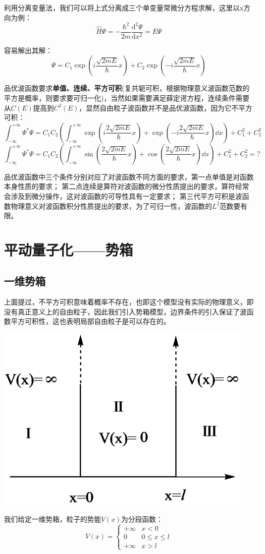 利用分离变量法，我们可以将上式分离成三个单变量常微分方程求解，这里以x方向为例：
\[\hat{H}\varPsi=-\frac{\hbar^2}{2m}\frac{\mathrm{d}^2\varPsi}{\mathrm{d}x^2}=E\varPsi\]

容易解出其解：
\[\varPsi=C_1\exp\left (i \frac{\sqrt{2mE}}{\hbar}x \right )+C_2\exp\left ( -i\frac{\sqrt{2mE}}{\hbar}x \right )\]

品优波函数要求\textbf{单值、连续、平方可积}(复共轭可积，根据物理意义波函数范数的平方是概率，则要求要可归一化)，当然如果需要满足薛定谔方程，连续条件需要从$C(E)$提高到$C^2(E)$，显然自由粒子波函数并不是品优波函数，因为它不平方可积：
\[\int_{-\infty}^{+\infty}\varPsi^*\varPsi=C_1C_2 \left ( \int_{-\infty}^{+\infty}\exp\left (i \frac{2\sqrt{2mE}}{\hbar}x \right )+\exp\left (-i \frac{2\sqrt{2mE}}{\hbar}x \right )\dd x \right )+C_1^2+C_2^2\]
\[\int_{-\infty}^{+\infty}\varPsi^*\varPsi=C_1C_2 \left ( \int_{-\infty}^{+\infty}\sin\left ( \frac{2\sqrt{2mE}}{\hbar}x \right )+\cos\left ( \frac{2\sqrt{2mE}}{\hbar}x \right )\dd x \right )+C_1^2+C_2^2=?\]

品优波函数中三个条件分别对应了对波函数不同方面的要求，第一点单值是对函数本身性质的要求；
第二点连续是算符对波函数的微分性质提出的要求，算符经常会涉及到微分操作，这对波函数的可导性具有一定要求；
第三代平方可积是波函数物理意义对波函数积分性质提出的要求，为了可归一性，波函数的$L^2$范数要有限。

\section{平动量子化——势箱}
\subsection{一维势箱}
上面提过，不平方可积意味着概率不存在，也即这个模型没有实际的物理意义，即没有真正意义上的自由粒子，因此我们引入势箱模型，边界条件的引入保证了波函数平方可积性，这也表明局部自由粒子是可以存在的。
\begin{center}
    \includegraphics[scale=0.5]{fig/lzhx/微信图片_20211025092646.png}
\end{center}
我们给定一维势箱，粒子的势能$V(x)$为分段函数：
\[V(x)=\left \{
\begin{array}{rl}
+\infty & x<0\\
0 & 0 \leq x \leq l\\
+\infty & x>l
\end{array} \right .\]

